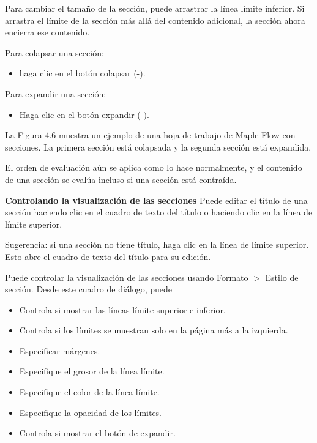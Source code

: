 Para cambiar el tamaño de la sección, puede arrastrar la línea límite inferior. Si arrastra el límite de la sección más allá del contenido adicional, la sección ahora encierra ese contenido.

Para colapsar una sección:

\begin{itemize}
	  \item haga clic en el botón colapsar (-).
\end{itemize}

Para expandir una sección:

\begin{itemize}
  \item Haga clic en el botón expandir ( $)$.
\end{itemize}

La Figura 4.6 muestra un ejemplo de una hoja de trabajo de Maple Flow con secciones. La primera sección está colapsada y la segunda sección está expandida.


El orden de evaluación aún se aplica como lo hace normalmente, y el contenido de una sección se evalúa incluso si una sección está contraída.

\textbf{Controlando la visualización de las secciones}
Puede editar el título de una sección haciendo clic en el cuadro de texto del título o haciendo clic en la línea de límite superior.

Sugerencia: si una sección no tiene título, haga clic en la línea de límite superior. Esto abre el cuadro de texto del título para su edición.

Puede controlar la visualización de las secciones usando Formato $>$ Estilo de sección. Desde este cuadro de diálogo, puede

\begin{itemize}
  \item Controla si mostrar las líneas límite superior e inferior.

\item Controla si los límites se muestran solo en la página más a la izquierda.

\item Especificar márgenes.

\item Especifique el grosor de la línea límite.

\item Especifique el color de la línea límite.

\item Especifique la opacidad de los límites.

\item Controla si mostrar el botón de expandir.
\end{itemize}

